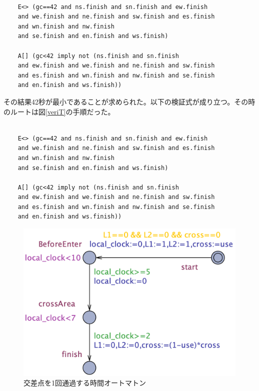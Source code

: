 \documentclass{tpu-sotu}
\begin{document}
	\begin{verbatim}
	
	E<> (gc==42 and ns.finish and sn.finish and ew.finish 
	and we.finish and ne.finish and sw.finish and es.finish
	and wn.finish and nw.finish
	and se.finish and en.finish and ws.finish)
	
	A[] (gc<42 imply not (ns.finish and sn.finish 
	and ew.finish and we.finish and ne.finish and sw.finish 
	and es.finish and wn.finish and nw.finish and se.finish 
	and en.finish and ws.finish))
	\end{verbatim}
	
	その結果42秒が最小であることが求められた。以下の検証式が成り立つ。その時のルートは図\ref{veriT}の手順だった。
	
	
	\begin{verbatim}
	
	E<> (gc==42 and ns.finish and sn.finish and ew.finish 
	and we.finish and ne.finish and sw.finish and es.finish
	and wn.finish and nw.finish
	and se.finish and en.finish and ws.finish)
	
	A[] (gc<42 imply not (ns.finish and sn.finish 
	and ew.finish and we.finish and ne.finish and sw.finish 
	and es.finish and wn.finish and nw.finish and se.finish 
	and en.finish and ws.finish))
	\end{verbatim}
	\begin{figure}[htbp]
	\centering
	\includegraphics[width=130mm]{minTime.png}
	\caption{交差点を1回通過する時間オートマトン}
	\label{minT}
	\end{figure}
\end{document}
